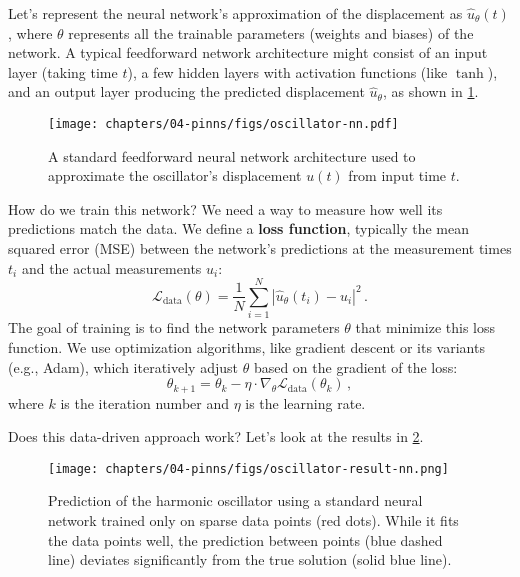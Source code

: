 Let's represent the neural network's approximation of the displacement as $\hat{u}_\theta(t)$, where $\theta$ represents all the trainable parameters (weights and biases) of the network. A typical feedforward network architecture might consist of an input layer (taking time $t$), a few hidden layers with activation functions (like $\tanh$), and an output layer producing the predicted displacement $\hat{u}_\theta$, as shown in \cref{fig:oscillator_nn_arch}.

\begin{figure}[htbp]
    \centering
    \texttt{[image: chapters/04-pinns/figs/oscillator-nn.pdf]}
    \caption{A standard feedforward neural network architecture used to approximate the oscillator's displacement $u(t)$ from input time $t$.}
    \label{fig:oscillator_nn_arch} %
\end{figure}

How do we train this network? We need a way to measure how well its predictions match the data. We define a \textbf{loss function}, typically the mean squared error (MSE) between the network's predictions at the measurement times $t_i$ and the actual measurements $u_i$:
%
\begin{equation}
\mathcal{L}_{\text{data}}(\theta) = \frac{1}{N}\sum_{i=1}^N |\hat{u}_\theta(t_i) - u_i|^2\,.
\label{eq:loss_data}
\end{equation}
%
The goal of training is to find the network parameters $\theta$ that minimize this loss function. We use optimization algorithms, like gradient descent or its variants (e.g., Adam), which iteratively adjust $\theta$ based on the gradient of the loss:
%
\begin{equation*}
\theta_{k+1} = \theta_k - \eta \cdot \nabla_\theta \mathcal{L}_{\text{data}}(\theta_k)\,,
\end{equation*}
%
where $k$ is the iteration number and $\eta$ is the learning rate.

Does this data-driven approach work? Let's look at the results in \cref{fig:oscillator_result_nn}.

\begin{figure}[htbp]
    \centering
    \texttt{[image: chapters/04-pinns/figs/oscillator-result-nn.png]}
    \caption{Prediction of the harmonic oscillator using a standard neural network trained only on sparse data points (red dots). While it fits the data points well, the prediction between points (blue dashed line) deviates significantly from the true solution (solid blue line).}
    \label{fig:oscillator_result_nn}
\end{figure}

